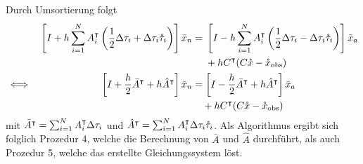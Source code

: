 Durch Umsortierung folgt
\begin{equation}
\label{eq:genMidpointAdjoint}
\begin{aligned}
&& \left[I +h\sum_{i=1}^N A_i^\intercal \left(\frac{1}{2} \Delta \tau_i +\Delta \tau_i \mathring{\tau}_i\right) \right]\bar{x}_n &= 
\begin{aligned}[t]
&\left[I - h\sum_{i=1}^N A_i^\intercal  \left(\frac{1}{2}\Delta \tau_i-\Delta \tau_i \mathring{\tau}_i\right)\right]\bar{x}_a \\
& +h C^\intercal(C\mathring{x} -\mathring{x}_{\text{obs}})
\end{aligned}\\
\iff&& \left[I +\frac{h}{2} \bar{A}^\intercal +h\hat{A}^\intercal\right]\bar{x}_n &= \left[I - \frac{h}{2}\bar{A}^\intercal + h\hat{A}^\intercal\right]\bar{x}_a  \\
&&&\quad +h C^\intercal(C\mathring{x} -\mathring{x}_{\text{obs}})\\
\end{aligned}
\end{equation}
mit $\bar{A}^\intercal = \sum_{i=1}^N A_i^\intercal \Delta \tau_i $ und $\hat{A}^\intercal = \sum_{i=1}^N A_i^\intercal \Delta \tau_i \mathring{\tau}_i$.
Als Algorithmus ergibt sich folglich Prozedur 4, welche die Berechnung von $\bar A$ und $\hat A$ durchführt, als auch Prozedur 5, welche das erstellte Gleichungssystem löst.
